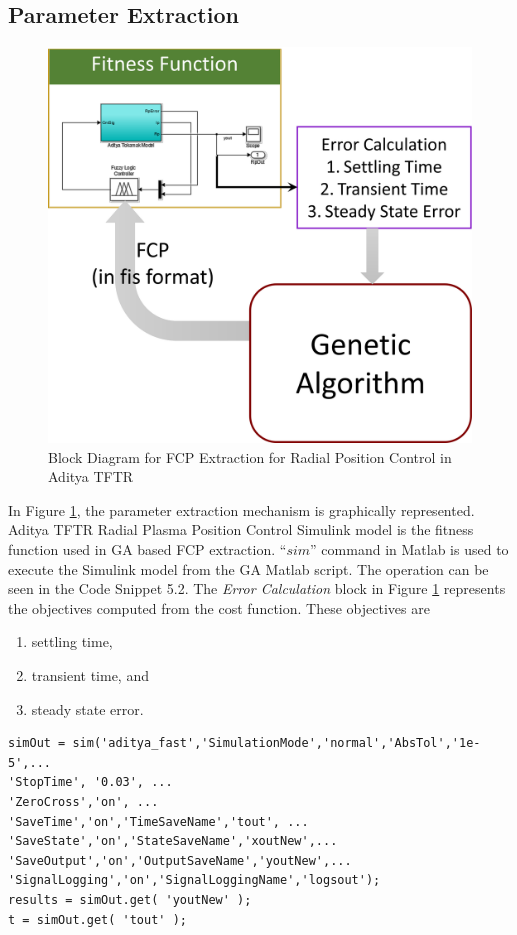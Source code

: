 \subsection{Parameter Extraction}
\begin{figure}[h!]
\centering
\includegraphics[width=0.7\linewidth]{Chapter5/chapter5/Fig10_AdityaFCP_Extraction}
\caption[Block Diagram for FCP Extraction for $R_P$ Control]{Block Diagram for FCP Extraction for Radial Position Control in Aditya TFTR}
\label{fig:Fig5_10}
\end{figure}
In Figure \ref{fig:Fig5_10}, the parameter extraction mechanism is graphically represented. Aditya TFTR Radial Plasma Position Control Simulink model is the fitness function used in GA based FCP extraction. ``$ sim $'' command in Matlab is used to execute the Simulink model from the GA Matlab script. The operation can be seen in the Code Snippet 5.2. The \textit{Error Calculation} block in Figure \ref{fig:Fig5_10} represents the objectives computed from the cost function. These objectives are 
\begin{enumerate}
	\item settling time,
	\item transient time, and
	\item steady state error.
\end{enumerate} 

\begin{lstlisting}
simOut = sim('aditya_fast','SimulationMode','normal','AbsTol','1e-5',...
'StopTime', '0.03', ... 
'ZeroCross','on', ...
'SaveTime','on','TimeSaveName','tout', ...
'SaveState','on','StateSaveName','xoutNew',...
'SaveOutput','on','OutputSaveName','youtNew',...
'SignalLogging','on','SignalLoggingName','logsout');
results = simOut.get( 'youtNew' );
t = simOut.get( 'tout' );
\end{lstlisting}



